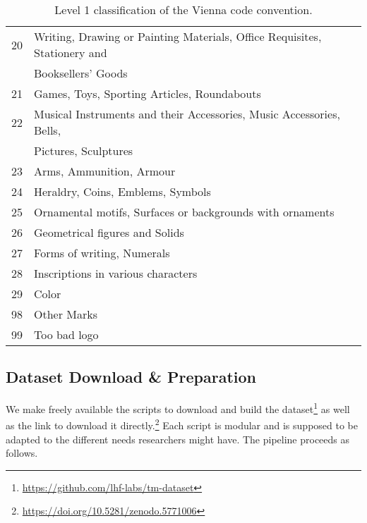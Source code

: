 \documentclass{article}
\begin{document}
\begin{table}[]
\begin{tabular}{|c|l|}
20        & Writing, Drawing or Painting Materials, Office Requisites, Stationery and \\
        &  Booksellers’ Goods      \\ \hline
21        & Games, Toys, Sporting Articles, Roundabouts      \\ \hline
22        & Musical Instruments and their Accessories, Music Accessories, Bells, \\
        &  Pictures, Sculptures      \\ \hline
23        & Arms, Ammunition, Armour      \\ \hline
24        & Heraldry, Coins, Emblems, Symbols      \\ \hline
25        & Ornamental motifs, Surfaces or backgrounds with ornaments      \\ \hline
26        & Geometrical figures and Solids      \\ \hline
27        & Forms of writing, Numerals      \\ \hline
28        & Inscriptions in various characters      \\ \hline
29        & Color      \\ \hline
98        & Other Marks      \\ \hline
99        & Too bad logo      \\ \hline
\end{tabular}
\label{tab:tab}
\caption{Level 1 classification of the Vienna code convention.}
\end{table}







\subsection{Dataset Download \& Preparation}
We make freely available the scripts to download and build the dataset\footnote{\url{https://github.com/lhf-labs/tm-dataset}} as well as the link to download it directly.\footnote{\url{https://doi.org/10.5281/zenodo.5771006}} Each script is modular and is supposed to be adapted to the different needs researchers might have. The pipeline proceeds as follows.
\end{document}
